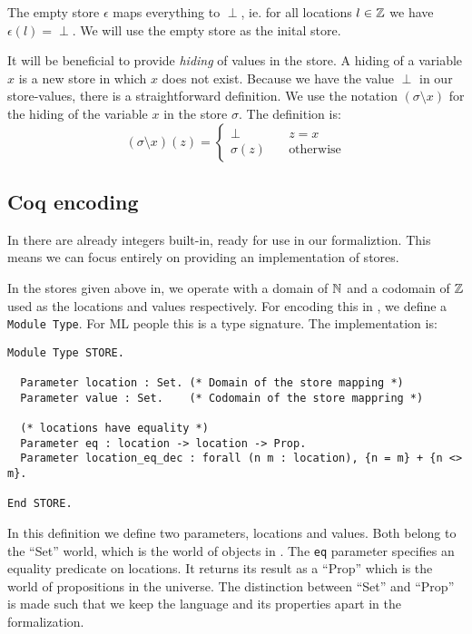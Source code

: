 The empty store $\epsilon$ maps everything to $\perp$, ie. for all
locations $l \in \mathbb{Z}$ we have $\epsilon(l) = \perp$. We will use the
empty store as the inital store.

It will be beneficial to provide \emph{hiding} of values in the store. A
hiding of a variable $x$ is a new store in which $x$ does not
exist. Because we have the value $\perp$ in our store-values, there is
a straightforward definition. We use the notation $(\sigma \setminus x)$
for the hiding of the variable $x$ in the store $\sigma$. The definition
is:
\begin{equation*}
  (\sigma \setminus x)(z) = \begin{cases}
    \perp & \quad z = x\\
    \sigma(z) & \quad \text{otherwise}
  \end{cases}
\end{equation*}

\subsection{Coq encoding}

In \coq{} there are already integers built-in, ready for use in our
formaliztion. This means we can focus entirely on providing an
implementation of stores.

In the stores given above in, we operate with a domain of $\mathbb{N}$ and a
codomain of $\mathbb{Z}$ used as the locations and values respectively. For
encoding this in \coq{}, we define a \texttt{Module Type}. For ML
people this is a type signature. The implementation is:
\begin{verbatim}
Module Type STORE.

  Parameter location : Set. (* Domain of the store mapping *)
  Parameter value : Set.    (* Codomain of the store mappring *)

  (* locations have equality *)
  Parameter eq : location -> location -> Prop.
  Parameter location_eq_dec : forall (n m : location), {n = m} + {n <> m}.

End STORE.
\end{verbatim}
In this definition we define two parameters, locations and
values. Both belong to the ``Set'' world, which is the world of
objects in \coq{}. The \texttt{eq} parameter specifies an equality
predicate on locations. It returns its result as a ``Prop'' which is
the world of propositions in the universe. The distinction between
``Set'' and ``Prop'' is made such that we keep the language and its
properties apart in the formalization.


